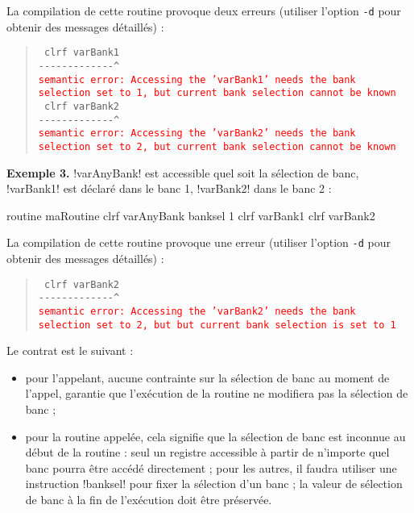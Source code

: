 La compilation de cette routine provoque deux erreurs (utiliser l’option \texttt{-d} pour obtenir des messages détaillés) :

\begin{quote}
\texttt{  clrf varBank1}\\
\texttt{-{-}-{-}-{-}-{-}-{-}-{-}-\^{}}\\
\textcolor{red}{\tt semantic error: Accessing the 'varBank1' needs the bank selection set to 1, but current bank selection cannot be known}\\

\texttt{  clrf varBank2}\\
\texttt{-{-}-{-}-{-}-{-}-{-}-{-}-\^}\\
\textcolor{red}{\tt semantic error: Accessing the 'varBank2' needs the bank selection set to 2, but current bank selection cannot be known}
\end{quote}




\textbf{Exemple 3.} \pic!varAnyBank! est accessible quel soit la sélection de banc, \pic!varBank1! est déclaré dans le banc 1, \pic!varBank2! dans le banc 2 :
\begin{piccolo}
routine maRoutine {
  clrf varAnyBank
  banksel 1
  clrf varBank1
  clrf varBank2
}
\end{piccolo}

La compilation de cette routine provoque une erreur (utiliser l’option \texttt{-d} pour obtenir des messages détaillés) :

\begin{quote}
\texttt{  clrf varBank2}\\
\texttt{-{-}-{-}-{-}-{-}-{-}-{-}-\^}\\
\textcolor{red}{\tt semantic error: Accessing the 'varBank2' needs the bank selection set to 2, but but current bank selection is set to 1}
\end{quote}














Le contrat est le suivant :
\begin{itemize}
  \item pour l'appelant, aucune contrainte sur la sélection de banc au moment de l'appel, garantie que l'exécution de la routine ne modifiera pas la sélection de banc ; 
\item pour la routine appelée, cela signifie que la sélection de banc est inconnue au début de la routine : seul un registre accessible à partir de n'importe quel banc pourra être accédé directement ; pour les autres, il faudra utiliser une instruction \pic!banksel! pour fixer la sélection d'un banc ; la valeur de sélection de banc à la fin de l'exécution doit être préservée.
\end{itemize}

